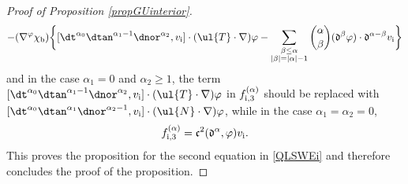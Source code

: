 \begin{proof}[Proof of Proposition \ref{propGUinterior}]
\begin{multline}
- (\nabla^\varphi\chi_\mathrm{b})\biggl\{ [\dt^{\alpha_0}\dtan^{\alpha_1-1}\dnor^{\alpha_2},v_\mathrm{i}]\cdot(\ul{T}\cdot\nabla)\varphi
- \sum_{\substack{\beta\leq\alpha\\ |\beta|=|\alpha|-1}} \binom{\alpha}{\beta}(\mathfrak{d}^{\beta}\varphi)\cdot\mathfrak{d}^{\alpha-\beta}v_\mathrm{i} \biggr\}
\end{multline}
and in the case $\alpha_1=0$ and $\alpha_2\geq1$, the term $[\dt^{\alpha_0}\dtan^{\alpha_1-1}\dnor^{\alpha_2},v_\mathrm{i}]\cdot(\ul{T}\cdot\nabla)\varphi$
in $f_{{\rm i},3}^{(\alpha)}$ should be replaced with $[\dt^{\alpha_0}\dtan^{\alpha_1}\dnor^{\alpha_2-1},v_\mathrm{i}]\cdot(\ul{N}\cdot\nabla)\varphi$,
while in the case $\alpha_1=\alpha_2=0$,
\begin{equation}\label{deffi3bis}
f_{{\rm i},3}^{(\alpha)} = \mathfrak{c}^2(\mathfrak{d}^\alpha,\varphi)v_\mathrm{i}.
\end{equation}
This proves the proposition for the second equation in \eqref{QLSWEi} and therefore concludes the proof of the proposition.
\end{proof}

